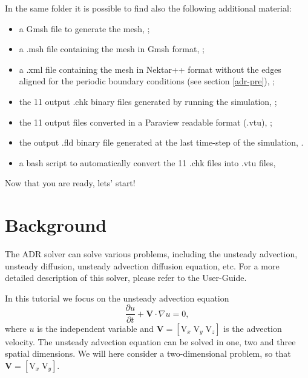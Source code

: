 In the same folder it is possible to find also the following additional material:
\vspace{-0.5cm}
\begin{itemize}
\item a Gmsh file to generate the mesh, ;
\item a .msh file containing the mesh in Gmsh format, ;
\item a .xml file containing the mesh in Nektar++ format without the edges aligned 
for the periodic boundary conditions (see section \ref{adr-pre}), ;
\item the 11 output .chk binary files generated by running the simulation, ;
\item the 11 output files converted in a Paraview readable format (.vtu),  ;
\item the output .fld binary file generated at the last time-step of the simulation, .
\item a bash script to automatically convert the 11 .chk files into .vtu files, 
\end{itemize}

\begin{center}
Now that you are ready, lets' start!
\end{center}

\section{Background}
The ADR solver can solve various problems, including the unsteady advection, unsteady diffusion, 
unsteady advection diffusion equation, etc. For a more detailed description of this solver, please 
refer to the User-Guide. 

In this tutorial we focus on the unsteady advection equation
\begin{equation}
\dfrac{\partial u}{\partial t} + \mathbf{V}\cdot\nabla u = 0,
\label{eq:advection}
\end{equation}
where $u$ is the independent variable and $\mathbf{V} = [\text{V}_{x}\; \text{V}_{y}\; \text{V}_{z}]$ 
is the advection velocity. The unsteady advection equation can be solved in one, two and three spatial 
dimensions. We will here consider a two-dimensional problem, so that $\mathbf{V} = [\text{V}_{x}\; \text{V}_{y}]$.

